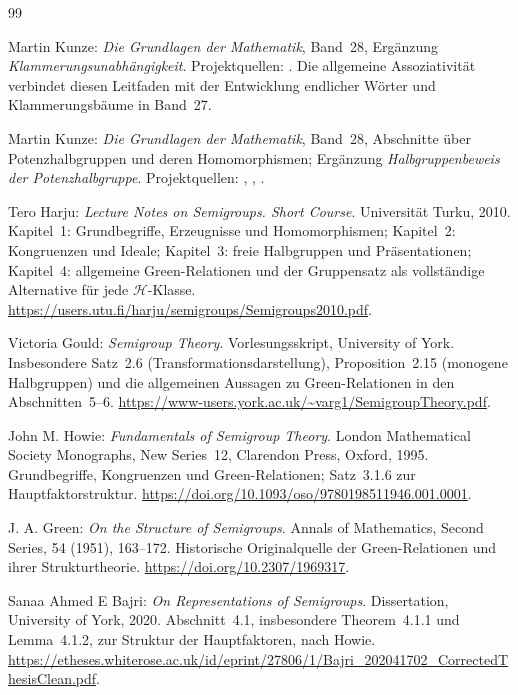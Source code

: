 \renewcommand{\bibname}{Quellen und Anschlüsse im Projekt}
\begin{thebibliography}{99}
\small
{}

Martin Kunze: \emph{Die Grundlagen der Mathematik}, Band~28,
Ergänzung \emph{Klammerungsunabhängigkeit}.
Projektquellen: .
Die allgemeine Assoziativität verbindet diesen Leitfaden mit der
Entwicklung endlicher Wörter und Klammerungsbäume in Band~27.

Martin Kunze: \emph{Die Grundlagen der Mathematik}, Band~28,
Abschnitte über Potenzhalbgruppen und deren Homomorphismen;
Ergänzung \emph{Halbgruppenbeweis der Potenzhalbgruppe}.
Projektquellen: ,
, .

Tero Harju: \emph{Lecture Notes on Semigroups. Short Course}.
Universität Turku, 2010.
Kapitel~1: Grundbegriffe, Erzeugnisse und Homomorphismen;
Kapitel~2: Kongruenzen und Ideale;
Kapitel~3: freie Halbgruppen und Präsentationen;
Kapitel~4: allgemeine Green-Relationen und der Gruppensatz
als vollständige Alternative für jede $\mathcal H$-Klasse.
\url{https://users.utu.fi/harju/semigroups/Semigroups2010.pdf}.

Victoria Gould: \emph{Semigroup Theory}.
Vorlesungsskript, University of York.
Insbesondere Satz~2.6 (Transformationsdarstellung),
Proposition~2.15 (monogene Halbgruppen) und
die allgemeinen Aussagen zu Green-Relationen in den Abschnitten~5--6.
\url{https://www-users.york.ac.uk/~varg1/SemigroupTheory.pdf}.

John M. Howie: \emph{Fundamentals of Semigroup Theory}.
London Mathematical Society Monographs, New Series~12,
Clarendon Press, Oxford, 1995.
Grundbegriffe, Kongruenzen und Green-Relationen;
Satz~3.1.6 zur Hauptfaktorstruktur.
\url{https://doi.org/10.1093/oso/9780198511946.001.0001}.

J. A. Green: \emph{On the Structure of Semigroups}.
Annals of Mathematics, Second Series, 54 (1951), 163--172.
Historische Originalquelle der Green-Relationen und ihrer Strukturtheorie.
\url{https://doi.org/10.2307/1969317}.

Sanaa Ahmed E Bajri: \emph{On Representations of Semigroups}.
Dissertation, University of York, 2020.
Abschnitt~4.1, insbesondere Theorem~4.1.1 und Lemma~4.1.2,
zur Struktur der Hauptfaktoren, nach Howie.
\url{https://etheses.whiterose.ac.uk/id/eprint/27806/1/Bajri_202041702_CorrectedThesisClean.pdf}.


\end{thebibliography}
